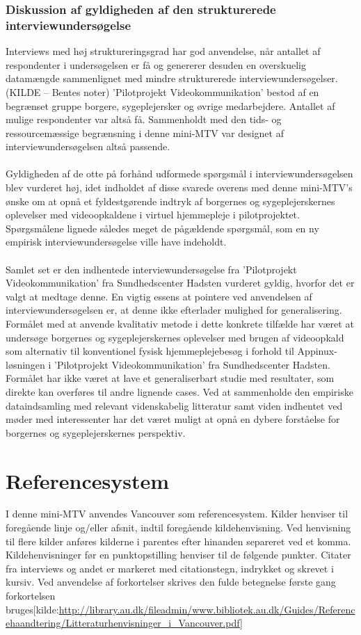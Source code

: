 \subsubsection{Diskussion af gyldigheden af den strukturerede interviewundersøgelse}
Interviews med høj struktureringsgrad har god anvendelse, når antallet af respondenter i undersøgelsen er få og genererer desuden en overskuelig datamængde sammenlignet med mindre strukturerede interviewundersøgelser. (KILDE – Bentes noter) ’Pilotprojekt Videokommunikation’ bestod af en begrænset gruppe borgere, sygeplejersker og øvrige medarbejdere. Antallet af mulige respondenter var altså få. Sammenholdt med den tids- og ressourcemæssige begrænsning i denne mini-MTV var designet af interviewundersøgelsen altså passende.\\ \\
Gyldigheden af de otte på forhånd udformede spørgsmål i interviewundersøgelsen blev vurderet høj, idet indholdet af disse svarede overens med denne mini-MTV’s ønske om at opnå et fyldestgørende indtryk af borgernes og sygeplejerskernes oplevelser med videoopkaldene i virtuel hjemmepleje i pilotprojektet. Spørgsmålene lignede således meget de pågældende spørgsmål, som en ny empirisk interviewundersøgelse ville have indeholdt.\\ \\
Samlet set er den indhentede interviewundersøgelse fra ’Pilotprojekt Videokommunikation’ fra Sundhedscenter Hadsten vurderet gyldig, hvorfor det er valgt at medtage denne. En vigtig essens at pointere ved anvendelsen af interviewundersøgelsen er, at denne ikke efterlader mulighed for generalisering. Formålet med at anvende kvalitativ metode i dette konkrete tilfælde har været at undersøge borgernes og sygeplejerskernes oplevelser med brugen af videoopkald som alternativ til konventionel fysisk hjemmeplejebesøg i forhold til Appinux-løsningen i ’Pilotprojekt Videokommunikation’ fra Sundhedscenter Hadsten. Formålet har ikke været at lave et generaliserbart studie med resultater, som direkte kan overføres til andre lignende cases. Ved at sammenholde den empiriske dataindsamling med relevant videnskabelig litteratur samt viden indhentet ved møder med interessenter har det været muligt at opnå en dybere forståelse for borgernes og sygeplejerskernes perspektiv. 

\section{Referencesystem}
I denne mini-MTV anvendes Vancouver som referencesystem. Kilder henviser til foregående linje og/eller afsnit, indtil foregående kildehenvisning. Ved henvisning til flere kilder anføres kilderne i parentes efter hinanden separeret ved et komma. Kildehenvisninger før en punktopstilling henviser til de følgende punkter. Citater fra interviews og andet er markeret med citationstegn, indrykket og skrevet i kursiv. Ved anvendelse af forkortelser skrives den fulde betegnelse første gang forkortelsen bruges[kilde:\url{http://library.au.dk/fileadmin/www.bibliotek.au.dk/Guides/Referencehaandtering/Litteraturhenvisninger_i_Vancouver.pdf}]

